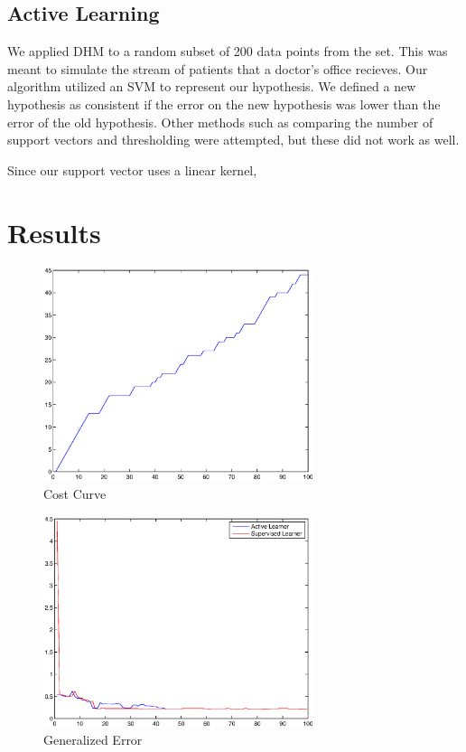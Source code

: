 \documentclass[12pt]{article}
\begin{document}
\subsection{Active Learning}

We applied DHM to a random subset of 200 data points from the set. This was meant to simulate the stream of patients that a doctor's office recieves. Our algorithm utilized an SVM to represent our hypothesis. We defined a new hypothesis as consistent if the error on the new hypothesis was lower than the error of the old hypothesis. Other methods such as comparing the number of support vectors and thresholding were attempted, but these did not work as well.

Since our support vector uses a linear kernel, 
\section{Results}

\begin{figure}
	\centering
	\includegraphics[width=300px]{costcurve}
	\caption{Cost Curve}
	\label{fig:costcurve}
\end{figure}

\begin{figure}
	\centering
	\includegraphics[width=300px]{generr}
	\caption{Generalized Error}
	\label{fig:generr}
\end{figure}
\end{document}
